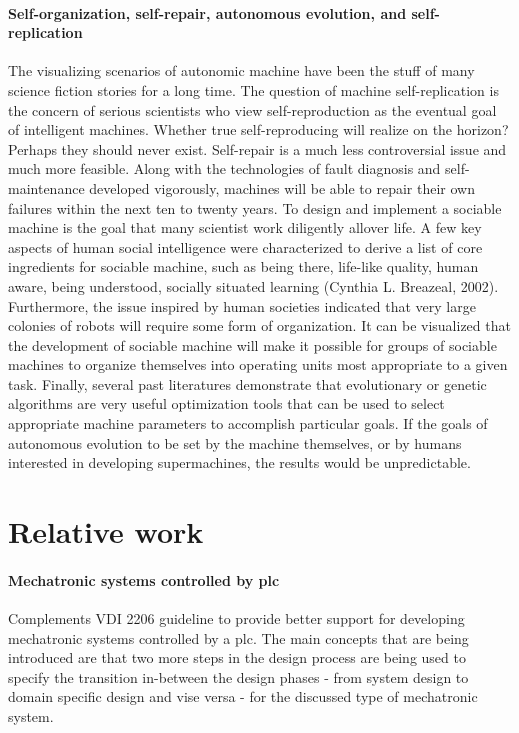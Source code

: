 \documentclass[a4paper,12pt,twoside]{report}
\begin{document}
{			\paragraph{Self-organization, self-repair, autonomous evolution, and self-replication} {The visualizing scenarios of autonomic machine have been the stuff of many science fiction stories for a long time. The question of machine self-replication is the concern of serious scientists who view self-reproduction as the eventual goal of intelligent machines. Whether true self-reproducing will realize on the horizon? Perhaps they should never exist. Self-repair is a much less controversial issue and much more feasible. Along with the technologies of fault diagnosis and self-maintenance developed vigorously, machines will be able to repair their own failures within the next ten to twenty years. To design and implement a sociable machine is the goal that many scientist work diligently allover life. A few key aspects of human social intelligence were characterized to derive a list of core ingredients for sociable machine, such as being there,  life-like quality, human aware, being understood, socially situated learning (Cynthia L. Breazeal, 2002). Furthermore, the issue inspired by human societies indicated that very large colonies of robots will require some form of organization. It can be visualized that the development of sociable machine will make it possible for groups of sociable machines to organize themselves into operating units most appropriate to a given task. Finally, several past literatures demonstrate that evolutionary or genetic algorithms are very useful optimization tools that can be used to select appropriate machine parameters to accomplish particular goals. If the goals of autonomous evolution to be set by the machine themselves, or by humans interested in developing supermachines, the results would be unpredictable. \cite{AReviewOfMechatronicsAndBioInspiredMechatronicsSystem:Luoa2008}			
			}

			\section{Relative work}
			\paragraph{Mechatronic systems controlled by plc} {\cite{ApplyingVDI2206OnMechatronicSystemsControlledByPLC:Bathelt2005} Complements VDI 2206 guideline to provide better support for developing mechatronic systems controlled by a plc. The main concepts that are being introduced are that two more steps in the design process are being used to specify the transition in-between the design phases - from system design to domain specific design and vise versa - for the discussed type of mechatronic system.			
			}
			
}
\end{document}

